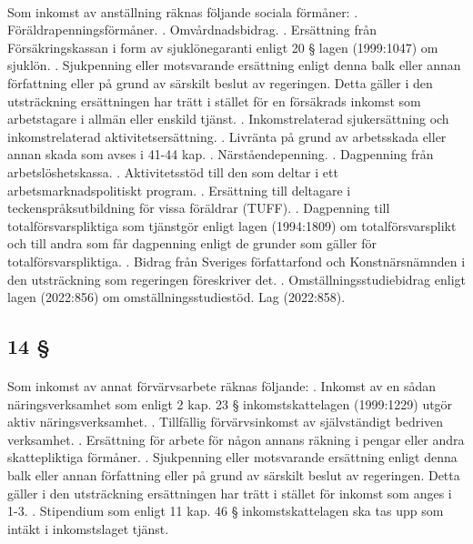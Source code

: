 \documentclass[a4paper,notitlepage,openany,10pt]{book}
\begin{document}
\paragraph*{}
Som inkomst av anställning räknas följande sociala förmåner:
. Föräldrapenningsförmåner.
. Omvårdnadsbidrag.
. Ersättning från Försäkringskassan i form av sjuklönegaranti enligt 20 § lagen (1999:1047) om sjuklön.
. Sjukpenning eller motsvarande ersättning enligt denna balk eller annan författning eller på grund av särskilt beslut av regeringen. Detta gäller i den utsträckning ersättningen har trätt i stället för en försäkrads inkomst som arbetstagare i allmän eller enskild tjänst.
. Inkomstrelaterad sjukersättning och inkomstrelaterad aktivitetsersättning.
. Livränta på grund av arbetsskada eller annan skada som avses i 41-44 kap.
. Närståendepenning.
. Dagpenning från arbetslöshetskassa.
. Aktivitetsstöd till den som deltar i ett arbetsmarknadspolitiskt program.
. Ersättning till deltagare i teckenspråksutbildning för vissa föräldrar (TUFF).
. Dagpenning till totalförsvarspliktiga som tjänstgör enligt lagen (1994:1809) om totalförsvarsplikt och till andra som får dagpenning enligt de grunder som gäller för totalförsvarspliktiga.
. Bidrag från Sveriges författarfond och Konstnärsnämnden i den utsträckning som regeringen föreskriver det.
. Omställningsstudiebidrag enligt lagen (2022:856) om omställningsstudiestöd.
Lag (2022:858).
\subsection*{14 §}
\paragraph*{}
Som inkomst av annat förvärvsarbete räknas följande:
. Inkomst av en sådan näringsverksamhet som enligt 2 kap. 23 § inkomstskattelagen (1999:1229) utgör aktiv näringsverksamhet.
. Tillfällig förvärvsinkomst av självständigt bedriven verksamhet.
. Ersättning för arbete för någon annans räkning i pengar eller andra skattepliktiga förmåner.
. Sjukpenning eller motsvarande ersättning enligt denna balk eller annan författning eller på grund av särskilt beslut av regeringen. Detta gäller i den utsträckning ersättningen har trätt i stället för inkomst som anges i 1-3.
. Stipendium som enligt 11 kap. 46 § inkomstskattelagen ska tas upp som intäkt i inkomstslaget tjänst.
\end{document}
